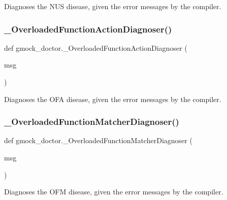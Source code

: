 \begin{DoxyVerb}Diagnoses the NUS disease, given the error messages by the compiler.\end{DoxyVerb}
 \mbox{\label{namespacegmock__doctor_a385cf8cf2ca6731bf66d721e2dbf89d1}} 
\subsubsection{\texorpdfstring{\_OverloadedFunctionActionDiagnoser()}{\_OverloadedFunctionActionDiagnoser()}}
{\footnotesize\ttfamily def gmock\+\_\+doctor.\+\_\+\+Overloaded\+Function\+Action\+Diagnoser (\begin{DoxyParamCaption}\item[{}]{msg }\end{DoxyParamCaption})\hspace{0.3cm}{\ttfamily [private]}}

\begin{DoxyVerb}Diagnoses the OFA disease, given the error messages by the compiler.\end{DoxyVerb}
 \mbox{\label{namespacegmock__doctor_a82934d9b43f75ab1112a9436c1a31068}} 
\subsubsection{\texorpdfstring{\_OverloadedFunctionMatcherDiagnoser()}{\_OverloadedFunctionMatcherDiagnoser()}}
{\footnotesize\ttfamily def gmock\+\_\+doctor.\+\_\+\+Overloaded\+Function\+Matcher\+Diagnoser (\begin{DoxyParamCaption}\item[{}]{msg }\end{DoxyParamCaption})\hspace{0.3cm}{\ttfamily [private]}}

\begin{DoxyVerb}Diagnoses the OFM disease, given the error messages by the compiler.\end{DoxyVerb}
 \mbox{\label{namespacegmock__doctor_a830bf3bac2d58666d82a75dfa0865c42}} 
